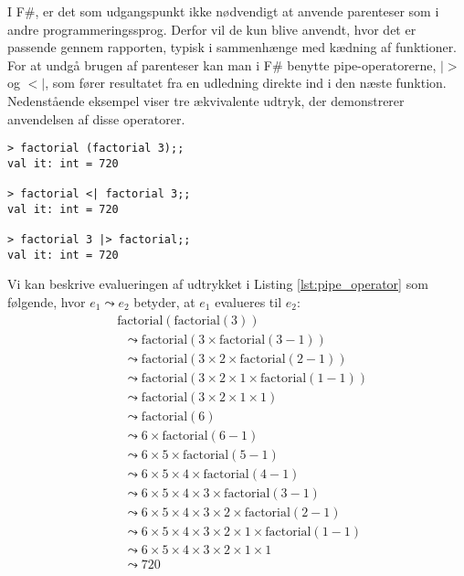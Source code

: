 I F\#, er det som udgangspunkt ikke nødvendigt at anvende parenteser som i andre programmeringssprog. Derfor vil de kun blive anvendt, hvor det er passende gennem rapporten, typisk i sammenhænge med kædning af funktioner. For at undgå brugen af parenteser kan man i F\# benytte pipe-operatorerne, $|>$ og $<|$, som fører resultatet fra en udledning direkte ind i den næste funktion. Nedenstående eksempel viser tre ækvivalente udtryk, der demonstrerer anvendelsen af disse operatorer.

\begin{lstlisting}[style=output, label={lst:pipe_operator}, caption={Eksempel på anvendelse af pipe-operatorer i F\# ved udregning af $(3!)! = 6! = 720 $.}]
> factorial (factorial 3);;
val it: int = 720

> factorial <| factorial 3;;
val it: int = 720

> factorial 3 |> factorial;;
val it: int = 720
\end{lstlisting}

Vi kan beskrive evalueringen af udtrykket i Listing \ref{lst:pipe_operator} som følgende, hvor $e_1 \leadsto e_2$ betyder, at $e_1$ evalueres til $e_2$:
\[
\begin{aligned}
&\text{factorial}(\text{factorial}(3)) \\
&\;\;\leadsto \text{factorial}(3 \times \text{factorial}(3 - 1)) \\
&\;\;\leadsto \text{factorial}(3 \times 2 \times \text{factorial}(2 - 1)) \\
&\;\;\leadsto \text{factorial}(3 \times 2 \times 1 \times \text{factorial}(1 - 1)) \\
&\;\;\leadsto \text{factorial}(3 \times 2 \times 1 \times 1) \\
&\;\;\leadsto \text{factorial}(6) \\
&\;\;\leadsto 6 \times \text{factorial}(6 - 1) \\
&\;\;\leadsto 6 \times 5 \times \text{factorial}(5 - 1) \\
&\;\;\leadsto 6 \times 5 \times 4 \times \text{factorial}(4 - 1) \\
&\;\;\leadsto 6 \times 5 \times 4 \times 3 \times \text{factorial}(3 - 1) \\
&\;\;\leadsto 6 \times 5 \times 4 \times 3 \times 2 \times \text{factorial}(2 - 1) \\
&\;\;\leadsto 6 \times 5 \times 4 \times 3 \times 2 \times 1 \times \text{factorial}(1 - 1) \\
&\;\;\leadsto 6 \times 5 \times 4 \times 3 \times 2 \times 1 \times 1 \\
&\;\;\leadsto 720
\end{aligned}
\]


